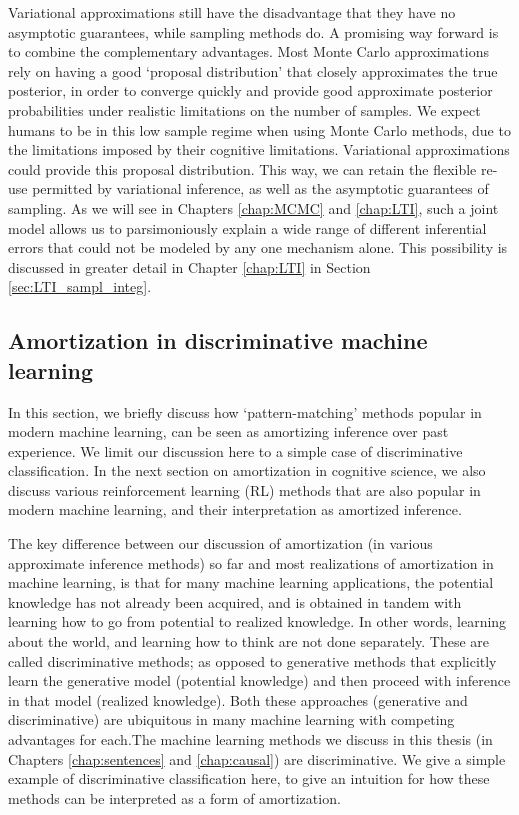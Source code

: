 Variational approximations still have the disadvantage that they have no asymptotic guarantees, while sampling methods do. A promising way forward is to combine the complementary advantages. Most Monte Carlo approximations rely on having a good `proposal distribution' that closely approximates the true posterior, in order to converge quickly and provide good approximate posterior probabilities under realistic limitations on the number of samples. We expect humans to be in this low sample regime when using Monte Carlo methods, due to the limitations imposed by their cognitive limitations. Variational approximations could provide this proposal distribution. This way, we can retain the flexible re-use permitted by variational inference, as well as the asymptotic guarantees of sampling. As we will see in Chapters \ref{chap:MCMC} and \ref{chap:LTI}, such a joint model allows us to parsimoniously explain a wide range of different inferential errors that could not be modeled by any one mechanism alone. This possibility is discussed in greater detail in Chapter \ref{chap:LTI} in Section \ref{sec:LTI_sampl_integ}.

\subsection{Amortization in discriminative machine learning}

In this section, we briefly discuss how `pattern-matching' methods popular in modern machine learning, can be seen as amortizing inference over past experience. We limit our discussion here to a simple case of discriminative classification. In the next section on amortization in cognitive science, we also discuss various reinforcement learning (RL) methods that are also popular in modern machine learning, and their interpretation as amortized inference.

The key difference between our discussion of amortization (in various approximate inference methods) so far and most realizations of amortization in machine learning, is that for many machine learning applications, the potential knowledge has not already been acquired, and is obtained in tandem with learning how to go from potential to realized knowledge. In other words, learning about the world, and learning how to think are not done separately. These are called discriminative methods; as opposed to generative methods that explicitly learn the generative model (potential knowledge) and then proceed with inference in that model (realized knowledge). Both these approaches (generative and discriminative) are ubiquitous in many machine learning with competing advantages for each\citep{ng2002discriminative, lasserre2006principled}.The machine learning methods we discuss in this thesis (in Chapters \ref{chap:sentences} and \ref{chap:causal}) are discriminative. We give a simple example of discriminative classification here, to give an intuition for how these methods can be interpreted as a form of amortization.

